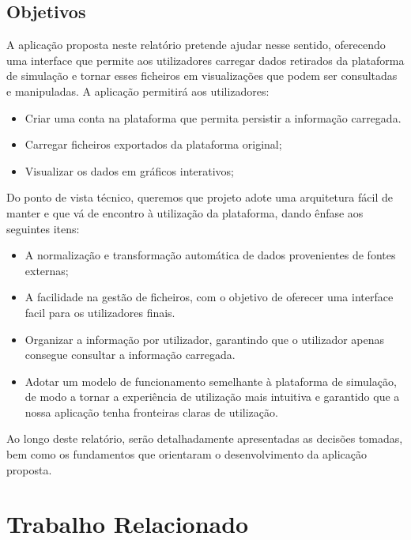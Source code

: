 \section{Objetivos}

A aplicação proposta neste relatório pretende ajudar nesse sentido, oferecendo uma interface que permite aos utilizadores carregar dados retirados da plataforma de simulação e tornar esses ficheiros em visualizações que podem ser consultadas e manipuladas. A aplicação permitirá aos utilizadores:
\begin{itemize}
    \item Criar uma conta na plataforma que permita persistir a informação carregada.
    \item Carregar ficheiros exportados da plataforma original;
    \item Visualizar os dados em gráficos interativos;
\end{itemize}

Do ponto de vista técnico, queremos que  projeto adote uma arquitetura fácil de manter e que vá de encontro à utilização da plataforma, dando ênfase aos seguintes itens:
\begin{itemize}
    \item A normalização e transformação automática de dados provenientes de fontes externas;
    \item A facilidade na gestão de ficheiros, com o objetivo de oferecer uma interface facil para os utilizadores finais.
    \item Organizar a informação por utilizador, garantindo que o utilizador apenas consegue consultar a informação carregada.
    \item Adotar um modelo de funcionamento semelhante à plataforma de simulação, de modo a tornar a experiência de utilização mais intuitiva e garantido que a nossa aplicação tenha fronteiras claras de utilização.
\end{itemize}

Ao longo deste relatório, serão detalhadamente apresentadas as decisões tomadas, bem como os fundamentos que orientaram o desenvolvimento da aplicação proposta.

\chapter{Trabalho Relacionado}
\label{ch:trabalhoRelacionado}

